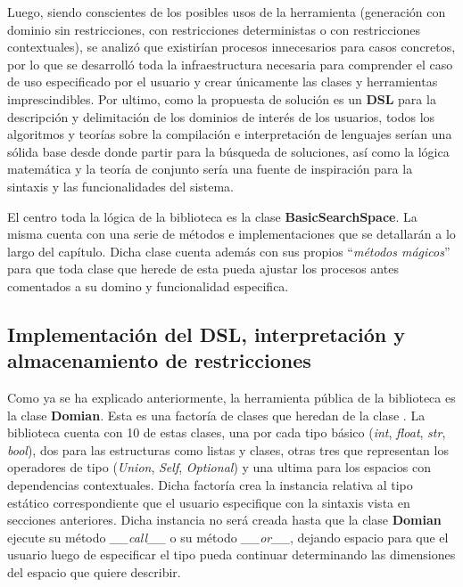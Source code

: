 Luego, siendo conscientes de los posibles usos de la herramienta (generación con dominio sin restricciones, con
restricciones deterministas o con restricciones contextuales), se analizó que existirían procesos innecesarios
para casos concretos, por lo que se desarrolló toda la infraestructura necesaria para comprender el caso de uso
especificado por el usuario y crear únicamente las clases y herramientas imprescindibles. Por ultimo, como la
propuesta de solución es un {\bf DSL} para la descripción y delimitación de los dominios de interés de los usuarios,
todos los algoritmos y teorías sobre la compilación e interpretación de lenguajes serían una sólida base desde
donde partir para la búsqueda de soluciones, así como la lógica matemática y la teoría de conjunto sería una
fuente de inspiración para la sintaxis y las funcionalidades del sistema.

El centro toda la lógica de la biblioteca es la clase {\bf BasicSearchSpace}. La misma cuenta con una
serie de métodos e implementaciones que se detallarán a lo largo del capítulo. Dicha clase cuenta además con
sus propios ``{\it métodos mágicos}'' para que toda clase que herede de esta pueda ajustar los procesos antes comentados
a su domino y funcionalidad especifica.


\subsection{Implementación del DSL, interpretación y almacenamiento de restricciones}

Como ya se ha explicado anteriormente, la herramienta pública de la biblioteca es la clase {\bf Domian}. Esta es una
factoría de clases que heredan de la clase . La biblioteca cuenta con 10 de estas clases, una
por cada tipo básico ({\it int}, {\it float}, {\it str}, {\it bool}), dos para las estructuras como listas y clases,
otras tres que representan los operadores de tipo ({\it Union}, {\it Self}, {\it Optional}) y una ultima para los
espacios con dependencias contextuales. Dicha factoría crea la instancia relativa al tipo estático correspondiente que el usuario
especifique con la sintaxis vista en secciones anteriores. Dicha instancia no será creada hasta que la clase
    {\bf Domian} ejecute su método {\it \_\_call\_\_} o su método {\it \_\_or\_\_}, dejando espacio para que el usuario
luego de especificar el tipo pueda continuar determinando las dimensiones del espacio que quiere describir.

